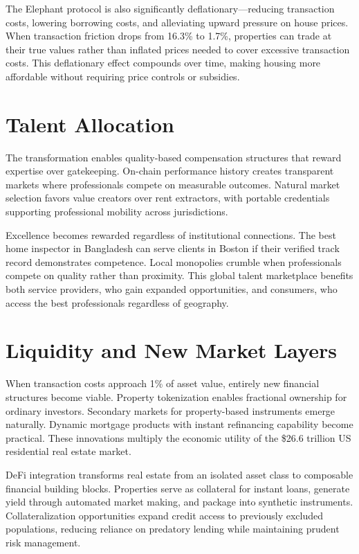 The Elephant protocol is also significantly deflationary—reducing transaction costs, lowering borrowing costs, and alleviating upward pressure on house prices. When transaction friction drops from 16.3\% to 1.7\%, properties can trade at their true values rather than inflated prices needed to cover excessive transaction costs. This deflationary effect compounds over time, making housing more affordable without requiring price controls or subsidies.

\section{Talent Allocation}

The transformation enables quality-based compensation structures that reward expertise over gatekeeping. On-chain performance history creates transparent markets where professionals compete on measurable outcomes. Natural market selection favors value creators over rent extractors, with portable credentials supporting professional mobility across jurisdictions.

Excellence becomes rewarded regardless of institutional connections. The best home inspector in Bangladesh can serve clients in Boston if their verified track record demonstrates competence. Local monopolies crumble when professionals compete on quality rather than proximity. This global talent marketplace benefits both service providers, who gain expanded opportunities, and consumers, who access the best professionals regardless of geography.

\section{Liquidity and New Market Layers}

When transaction costs approach 1\% of asset value, entirely new financial structures become viable. Property tokenization enables fractional ownership for ordinary investors. Secondary markets for property-based instruments emerge naturally. Dynamic mortgage products with instant refinancing capability become practical. These innovations multiply the economic utility of the \$26.6 trillion US residential real estate market.

DeFi integration transforms real estate from an isolated asset class to composable financial building blocks. Properties serve as collateral for instant loans, generate yield through automated market making, and package into synthetic instruments. Collateralization opportunities expand credit access to previously excluded populations, reducing reliance on predatory lending while maintaining prudent risk management.

